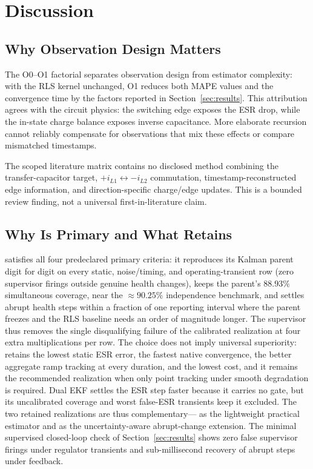\section{Discussion}
\label{sec:discussion}

\subsection{Why Observation Design Matters}

The O0--O1 factorial separates observation design from estimator complexity: with the RLS kernel unchanged, O1 reduces both MAPE values and the convergence time by the factors reported in Section~\ref{sec:results}. This attribution agrees with the circuit physics: the switching edge exposes the ESR drop, while the in-state charge balance exposes inverse capacitance. More elaborate recursion cannot reliably compensate for observations that mix these effects or compare mismatched timestamps.

The scoped literature matrix contains no disclosed method combining the \Cuk{} transfer-capacitor target, $+i_{L1}\leftrightarrow-i_{L2}$ commutation, timestamp-reconstructed edge information, and direction-specific charge/edge updates. This is a bounded review finding, not a universal first-in-literature claim.

\subsection{Why \TSSRKE{} Is Primary and What \TSRLS{} Retains}

\TSSRKE{} satisfies all four predeclared primary criteria: it reproduces its Kalman parent digit for digit on every static, noise/timing, and operating-transient row (zero supervisor firings outside genuine health changes), keeps the parent's $88.93\%$ simultaneous coverage, near the $\approx90.25\%$ independence benchmark, and settles abrupt health steps within a fraction of one reporting interval where the parent freezes and the RLS baseline needs an order of magnitude longer. The supervisor thus removes the single disqualifying failure of the calibrated realization at four extra multiplications per row. The choice does not imply universal superiority: \TSRLS{} retains the lowest static ESR error, the fastest native convergence, the better aggregate ramp tracking at every duration, and the lowest cost, and it remains the recommended realization when only point tracking under smooth degradation is required. Dual EKF settles the ESR step faster because it carries no gate, but its uncalibrated coverage and worst false-ESR transients keep it excluded. The two retained realizations are thus complementary---\TSRLS{} as the lightweight practical estimator and \TSSRKE{} as the uncertainty-aware abrupt-change extension. The minimal supervised closed-loop check of Section~\ref{sec:results} shows zero false supervisor firings under regulator transients and sub-millisecond recovery of abrupt steps under feedback.

